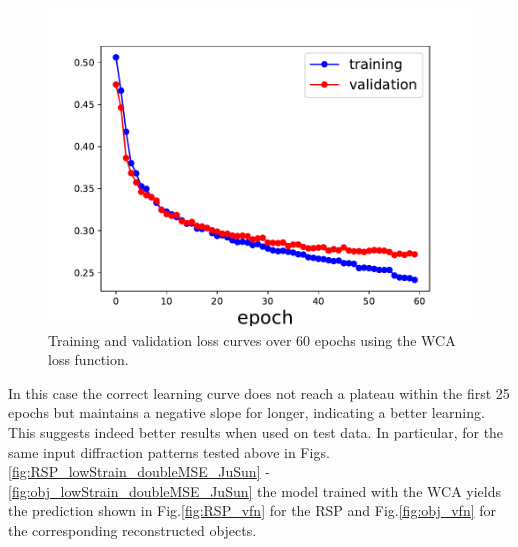\begin{figure}[H]
    \centering
    \includegraphics[width=.8\textwidth]{figures/Phasing/loss_low_strain_noiseless_doubleVFN.pdf}
    \caption{Training and validation loss curves over 60 epochs using the WCA loss function.}
    \label{fig:loss_vfn}
\end{figure}

In this case the correct learning curve does not reach a plateau within the first 25 epochs but maintains a negative slope 
for longer, indicating a better learning. This suggests indeed better results when used on test data. 
In particular, for the same input diffraction patterns tested above in Figs.\ref{fig:RSP_lowStrain_doubleMSE_JuSun} - \ref{fig:obj_lowStrain_doubleMSE_JuSun}
the model trained with the WCA yields the prediction shown in Fig.\ref{fig:RSP_vfn} for the RSP and Fig.\ref{fig:obj_vfn} 
for the corresponding reconstructed objects. 

